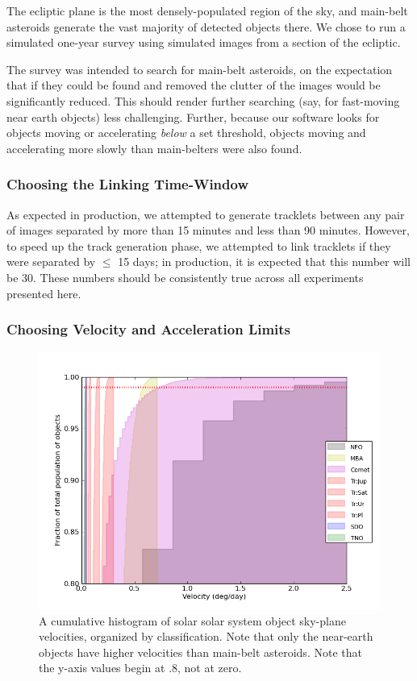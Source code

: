 \documentclass[12pt,preprint]{aastex}
\begin{document}
The ecliptic plane is the most densely-populated region of the sky,
and main-belt asteroids generate the vast majority of detected objects
there.  We chose to run a simulated one-year survey using simulated
images from a section of the ecliptic.  

The survey was intended to search for main-belt asteroids, on the
expectation that if they could be found and removed the clutter of the
images would be significantly reduced. This should render further
searching (say, for fast-moving near earth objects) less challenging.
Further, because our software looks for objects moving or accelerating
\textit{below} a set threshold, objects moving and accelerating more
slowly than main-belters were also found.

\subsubsection{Choosing the Linking Time-Window}

As expected in production, we attempted to generate tracklets between
any pair of images separated by more than 15 minutes and less than
90 minutes.  However, to speed up the track generation phase, we
attempted to link tracklets if they were separated by $\leq$ 15 days;
in production, it is expected that this number will be 30.  These
numbers should be consistently true across all experiments presented
here.


\subsubsection{Choosing Velocity and Acceleration Limits}
\label{velAccLimits}
\begin{figure}[ht!]
  \centering
  \includegraphics[width=13cm]{illustrations/mopsplots/findtracklets_vel1.png}
  \caption{A cumulative histogram of solar solar system object
    sky-plane velocities, organized by classification.  Note that only
    the near-earth objects have higher velocities than main-belt
    asteroids.  Note that the y-axis values begin at .8, not at zero.}
  \label{velSurvey}
\end{figure}
\end{document}
